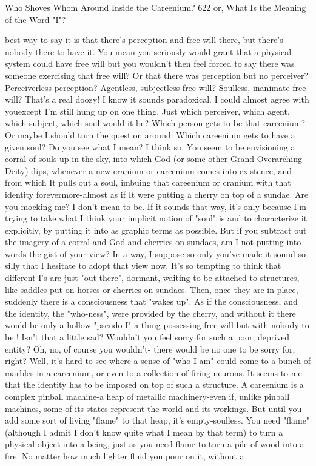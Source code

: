 Who Shoves Whom Around Inside the Careenium?                                         622
or, What Is the Meaning of the Word "I"?

  best way to say it is that there's perception and free will there, but there's nobody
  there to have it.
\tortoise You mean you seriously would grant that a physical system could have
  free will but you wouldn't then feel forced to say there was someone exercising
  that free will? Or that there was perception but no perceiver? Perceiverless
  perception? Agentless, subjectless free will? Soulless, inanimate free will? That's a
  real doozy!
\achilles I know it sounds paradoxical. I could almost agree with youexcept I'm
  still hung up on one thing. Just which perceiver, which agent, which subject, which
  soul would it be? Which person gets to be that careenium? Or maybe I should turn
  the question around: Which careenium gets to have a given soul? Do you see what
  I mean?
\tortoise I think so. You seem to be envisioning a corral of souls up in the sky,
  into which God (or some other Grand Overarching Deity) dips, whenever a new
  cranium or careenium comes into existence, and from which It pulls out a soul,
  imbuing that careenium or cranium with that identity forevermore-almost as if It
  were putting a cherry on top of a sundae.
\achilles Are you mocking me?
\tortoise I don't mean to be. If it sounds that way, it's only because I'm trying to
  take what I think your implicit notion of "soul" is and to characterize it explicitly,
  by putting it into as graphic terms as possible. But if you subtract out the imagery
  of a corral and God and cherries on sundaes, am I not putting into words the gist of
  your view?
\achilles In a way, I suppose so-only you've made it sound so silly that I hesitate
  to adopt that view now.
\tortoise It's so tempting to think that different I's are just "out there", dormant,
  waiting to be attached to structures, like saddles put on horses or cherries on
  sundaes. Then, once they are in place, suddenly there is a consciousness that
  "wakes up". As if the consciousness, and the identity, the "who-ness", were
  provided by the cherry, and without it there would be only a hollow "pseudo-I"-a
  thing possessing free will but with nobody to be ! Isn't that a little sad? Wouldn't
  you feel sorry for such a poor, deprived entity? Oh, no, of course you wouldn't-
  there would be no one to be sorry for, right?
\achilles Well, it's hard to see where a sense of "who I am" could come to a bunch
  of marbles in a careenium, or even to a collection of firing neurons. It seems to me
  that the identity has to be imposed on top of such a structure. A careenium is a
  complex pinball machine-a heap of metallic machinery-even if, unlike pinball
  machines, some of its states represent the world and its workings. But until you
  add some sort of living "flame" to that heap, it's empty-soulless. You need "flame"
  (although I admit I don't know quite what I mean by that term) to turn a physical
  object into a being, just as you need flame to turn a pile of wood into a fire. No
  matter how much lighter fluid you pour on it, without a




